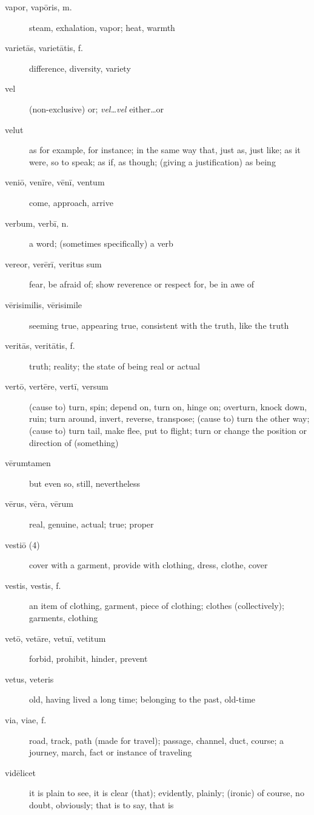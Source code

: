 \begin{description}
    \item[vapor, vapōris, m.] steam, exhalation, vapor; heat, warmth
    \item[varietās, varietātis, f.] difference, diversity, variety
    \item[vel] \marginnote{*}(non-exclusive) or; \textit{vel\dots vel} either\dots or
    \item[velut] \marginnote{*}as for example, for instance; in the same way that, just as, just like; as it were, so to speak; as if, as though; (giving a justification) as being
    \item[veniō, venīre, vēnī, ventum] \marginnote{*}come, approach, arrive
    \item[verbum, verbī, n.] \marginnote{*}a word; (sometimes specifically) a verb
    \item[vereor, verērī, veritus sum] \marginnote{*}fear, be afraid of; show reverence or respect for, be in awe of
    \item[vērisimilis, vērisimile] seeming true, appearing true, consistent with the truth, like the truth
    \item[veritās, veritātis, f.] truth; reality; the state of being real or actual
    \item[vertō, vertēre, vertī, versum] \marginnote{*}(cause to) turn, spin; depend on, turn on, hinge on; overturn, knock down, ruin; turn around, invert, reverse, transpose; (cause to) turn the other way; (cause to) turn tail, make flee, put to flight; turn or change the position or direction of (something)
    \item[vērumtamen] but even so, still, nevertheless
    \item[vērus, vēra, vērum] \marginnote{*}real, genuine, actual; true; proper
    \item[vestiō (4)] cover with a garment, provide with clothing, dress, clothe, cover
    \item[vestis, vestis, f.] an item of clothing, garment, piece of clothing; clothes (collectively); garments, clothing
    \item[vetō, vetāre, vetuī, vetitum] \marginnote{*}forbid, prohibit, hinder, prevent
    \item[vetus, veteris] \marginnote{*}old, having lived a long time; belonging to the past, old-time
    \item[via, viae, f.] \marginnote{*}road, track, path (made for travel); passage, channel, duct, course; a journey, march, fact or instance of traveling
    \item[vidēlicet] it is plain to see, it is clear (that); evidently, plainly; (ironic) of course, no doubt, obviously; that is to say, that is

\end{description}
